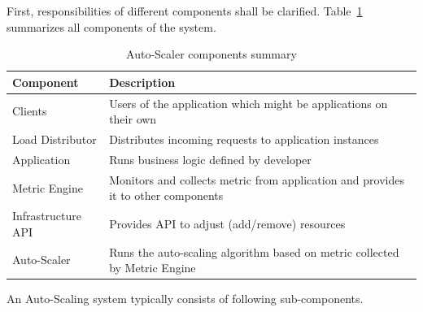 First, responsibilities of different components shall be clarified. Table~\ref{tab:auto-scaler-sum} summarizes all components of the system.
\begin{table}
    \begin{tabular}{ll}
        \toprule
        \textbf{Component} & \textbf{Description}\\
        \midrule
        Clients & Users of the application which might be applications on their own\\
        Load Distributor & Distributes incoming requests to application instances\\
        Application & Runs business logic defined by developer\\
        Metric Engine & Monitors and collects metric from application and provides it to other components\\
        Infrastructure API & Provides API to adjust (add/remove) resources\\
        Auto-Scaler & Runs the auto-scaling algorithm based on metric collected by Metric Engine\\
        \bottomrule
    \end{tabular}
    \centering
    \caption{Auto-Scaler components summary}
    \label{tab:auto-scaler-sum}
\end{table}
An Auto-Scaling system typically consists of following sub-components.
